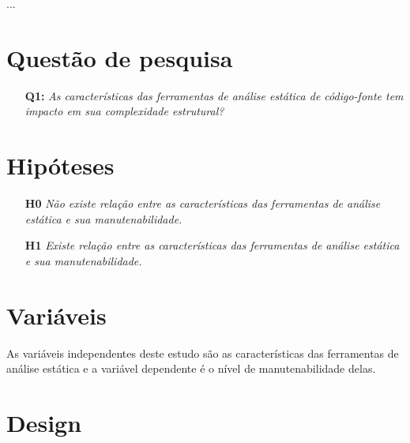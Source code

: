 {...}
\label{planejamento}

\section{Questão de pesquisa}

\begin{enumerate}
  \item [{\bf Q1:}] {\em As características das ferramentas de análise estática
  de código-fonte tem impacto em sua complexidade estrutural?}
\end{enumerate}

\section{Hipóteses} \label{hipoteses}

\begin{enumerate}
  \item[{\bf H0}] {\em Não existe relação entre as características das
  ferramentas de análise estática e sua manutenabilidade.}
  \item[{\bf H1}] {\em Existe relação entre as características das ferramentas
  de análise estática e sua manutenabilidade.}
\end{enumerate}

\section{Variáveis}

As variáveis independentes deste estudo são as características das ferramentas
de análise estática e a variável dependente é o nível de manutenabilidade
delas.

\section{Design}

%
%


